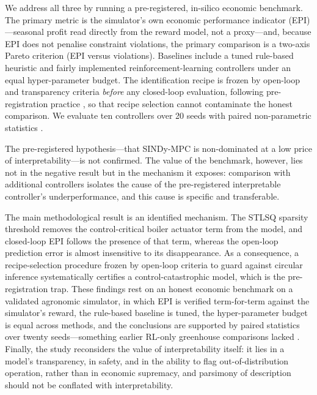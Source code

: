 \documentclass[preprint,3p]{elsarticle}
\begin{document}
We address all three by running a pre-registered, in-silico economic benchmark. The
primary metric is the simulator's own economic performance indicator (EPI)---seasonal
profit read directly from the reward model, not a proxy---and, because EPI does not
penalise constraint violations, the primary comparison is a two-axis Pareto criterion
(EPI versus violations). Baselines include a tuned rule-based heuristic and fairly
implemented reinforcement-learning controllers under an equal hyper-parameter budget.
The identification recipe is frozen by open-loop and transparency criteria
\emph{before} any closed-loop evaluation, following pre-registration practice
\citep{pineau2021repro}, so that recipe selection cannot contaminate the honest
comparison. We evaluate ten controllers over 20 seeds with paired non-parametric
statistics \citep{wilcoxon1945,holm1979,efron1994bootstrap}.

The pre-registered hypothesis---that SINDy-MPC is non-dominated at a low price of
interpretability---is not confirmed. The value of the benchmark, however, lies not
in the negative result but in the mechanism it exposes: comparison with additional
controllers isolates the cause of the pre-registered interpretable controller's
underperformance, and this cause is specific and transferable.

The main methodological result is an identified mechanism. The STLSQ sparsity
threshold removes the control-critical boiler actuator term from the model, and
closed-loop EPI follows the presence of that term, whereas the open-loop prediction
error is almost insensitive to its disappearance. As a consequence, a
recipe-selection procedure frozen by open-loop criteria to guard against circular
inference systematically certifies a control-catastrophic model, which is the
pre-registration trap. These findings rest on an honest economic benchmark on a
validated agronomic simulator, in which EPI is verified term-for-term against the
simulator's reward, the rule-based baseline is tuned, the hyper-parameter budget is
equal across methods, and the conclusions are supported by paired statistics over
twenty seeds---something earlier RL-only greenhouse comparisons lacked
\citep{vanlaatum2025greenlightgym}. Finally, the study reconsiders the value of
interpretability itself: it lies in a model's transparency, in safety, and in the
ability to flag out-of-distribution operation, rather than in economic supremacy, and
parsimony of description should not be conflated with interpretability.

\end{document}
